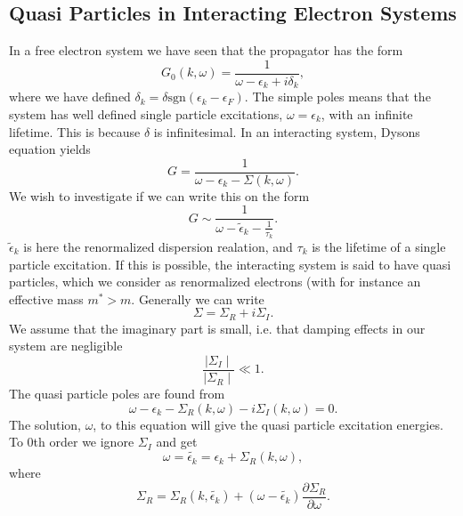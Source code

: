 \subsection{Quasi Particles in Interacting Electron Systems}
In a free electron system we have seen that the propagator has the form
\begin{equation}
G_0(k,\omega)=\frac{1}{\omega-\epsilon_k+i\delta_k},
\end{equation}
where we have defined $\delta_k=\delta \text{sgn}(\epsilon_k-\epsilon_F)$. The simple poles means that the system has well defined single particle excitations, $\omega=\epsilon_k$, with an infinite lifetime. This is because $\delta$ is infinitesimal. In an interacting system, Dysons equation yields
\begin{equation}
G=\frac{1}{\omega-\epsilon_k-\Sigma(k,\omega)}.
\end{equation}
We wish to investigate if we can write this on the form
\begin{equation}
G \sim \frac{1}{\omega-\widetilde{\epsilon}_k-\frac{1}{\tau_k}}.
\end{equation}
$\widetilde{\epsilon}_k$ is here the renormalized dispersion realation, and $\tau_k$ is the lifetime of a single particle excitation. If this is possible, the interacting system is said to have quasi particles, which we consider as renormalized electrons (with for instance an effective mass $m^*>m$. Generally we can write
\begin{equation}
\Sigma=\Sigma_R+i\Sigma_I.
\end{equation}
We assume that the imaginary part is small, i.e. that damping effects in our system are negligible
\begin{equation}
\frac{\mid \Sigma_I \mid}{\mid \Sigma_R \mid}\ll 1.
\end{equation}
The quasi particle poles are found from
\begin{equation}
\omega-\epsilon_k-\Sigma_R(k,\omega)-i\Sigma_I(k,\omega)=0.
\end{equation}
The solution, $\omega$, to this equation will give the quasi particle excitation energies. To 0th order we ignore $\Sigma_I$ and get
\begin{equation}
\omega=\widetilde{\epsilon_k}=\epsilon_k+\Sigma_R(k,\omega),
\end{equation}
where
\begin{equation}
\Sigma_R=\Sigma_R(k,\widetilde{\epsilon_k})+(\omega-\widetilde{\epsilon_k})\frac{\partial \Sigma_R}{\partial \omega}.
\end{equation}
